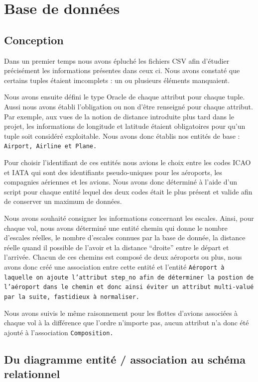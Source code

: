 \documentclass[a4paper, 11pt, twoside]{book}
\begin{document}
\section{Base de données}

\subsection{Conception}
Dans un premier temps nous avons épluché les fichiers CSV afin d'étudier précisément les informations présentes dans ceux ci. Nous avons constaté que certains tuples étaient imcomplets : un ou plusieurs éléments manquaient.

Nous avons ensuite défini le type Oracle de chaque attribut pour chaque tuple. Aussi nous avons établi l'obligation ou non d'être renseigné pour chaque attribut. Par exemple, aux vues de la notion de distance introduite plus tard dans le projet, les informations de longitude et latitude étaient obligatoires pour qu'un tuple soit considéré exploitable. Nous avons donc établis nos entités de base :  \tt{Airport},  \tt{Airline} et  \tt{Plane}.

Pour choisir l'identifiant de ces entités nous avions le choix entre les codes ICAO et IATA qui sont des identifiants pseudo-uniques pour les aéroports, les compagnies aériennes et les avions. Nous avons donc déterminé à l'aide d'un script  pour chaque entité lequel des deux codes était le plus présent et valide afin de conserver un maximum de données.

Nous avons souhaité consigner les informations concernant les escales. Ainsi, pour chaque vol, nous avons déterminé une entité chemin qui donne le nombre d'escales réelles, le nombre d'escales connues par la base de donnée, la distance réelle quand il possible de l'avoir et la distance ``droite'' entre le départ et l'arrivée. Chacun de ces chemins est composé de deux aéroports ou plus, nous avons donc créé une association entre cette entité et l'entité  \tt{Aéroport} à laquelle on ajoute l'attribut  \tt{step\_no} afin de déterminer la postion de l'aéroport dans le chemin et donc ainsi éviter un attribut multi-valué par la suite, fastidieux à normaliser.

Nous avons suivis le même raisonnement pour les flottes d'avions associées à chaque vol à la différence que l'ordre n'importe pas, aucun attribut n'a donc été ajouté à l'association  \tt{Composition}.


\subsection{Du diagramme entité / association au schéma relationnel}
\end{document}
